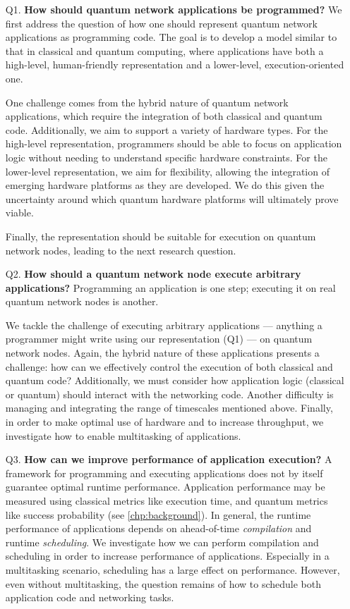 \begin{itemize}
  \item[Q1.] \textbf{How should quantum network applications be programmed?}
    We first address the question of how one should represent quantum network applications as programming code.
    The goal is to develop a model similar to that in classical and quantum computing, where applications have both a high-level, human-friendly representation and a lower-level, execution-oriented one.

    One challenge comes from the hybrid nature of quantum network applications, which require the integration of both classical and quantum code.
    Additionally, we aim to support a variety of hardware types.
    For the high-level representation, programmers should be able to focus on application logic without needing to understand specific hardware constraints.
    For the lower-level representation, we aim for flexibility, allowing the integration of emerging hardware platforms as they are developed.
    We do this given the uncertainty around which quantum hardware platforms will ultimately prove viable.

    Finally, the representation should be suitable for execution on quantum network nodes, leading to the next research question.

  \item[Q2.] \textbf{How should a quantum network node execute arbitrary applications?}
    Programming an application is one step; executing it on real quantum network nodes is another.

    We tackle the challenge of executing arbitrary applications --- anything a programmer might write using our representation (Q1) --- on quantum network nodes.
    Again, the hybrid nature of these applications presents a challenge: how can we effectively control the execution of both classical and quantum code?
    Additionally, we must consider how application logic (classical or quantum) should interact with the networking code.
    Another difficulty is managing and integrating the range of timescales mentioned above.
    Finally, in order to make optimal use of hardware and to increase throughput, we investigate how to enable multitasking of applications.

  \item[Q3.] \textbf{How can we improve performance of application execution?}
    A framework for programming and executing applications does not by itself guarantee optimal runtime performance.
    Application performance may be measured using classical metrics like execution time, and quantum metrics like success probability (see \cref{chp:background}).
    In general, the runtime performance of applications depends on ahead-of-time \emph{compilation} and runtime \emph{scheduling}.
    We investigate how we can perform compilation and scheduling in order to increase performance of applications.
    Especially in a multitasking scenario, scheduling has a large effect on performance.
    However, even without multitasking, the question remains of how to schedule both application code and networking tasks.

\end{itemize}


